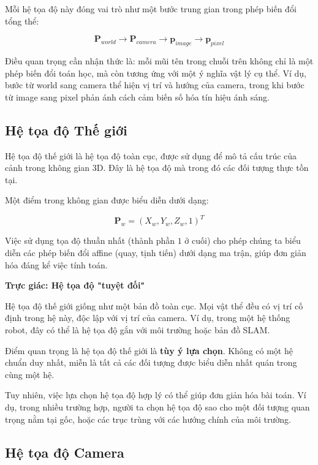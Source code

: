 Mỗi hệ tọa độ này đóng vai trò như một bước trung gian trong phép biến đổi tổng thể:

\[
\mathbf{P}_{world} \rightarrow \mathbf{P}_{camera} \rightarrow \mathbf{p}_{image} \rightarrow \mathbf{p}_{pixel}
\]

Điều quan trọng cần nhận thức là: mỗi mũi tên trong chuỗi trên không chỉ là một phép biến đổi toán học, mà còn tương ứng với một ý nghĩa vật lý cụ thể. Ví dụ, bước từ world sang camera thể hiện vị trí và hướng của camera, trong khi bước từ image sang pixel phản ánh cách cảm biến số hóa tín hiệu ánh sáng.

\subsection{Hệ tọa độ Thế giới}
\label{subsec:world_coordinate}

Hệ tọa độ thế giới là hệ tọa độ toàn cục, được sử dụng để mô tả cấu trúc của cảnh trong không gian 3D. Đây là hệ tọa độ mà trong đó các đối tượng thực tồn tại.

Một điểm trong không gian được biểu diễn dưới dạng:

\[
\mathbf{P}_w = (X_w, Y_w, Z_w, 1)^T
\]

Việc sử dụng tọa độ thuần nhất (thành phần $1$ ở cuối) cho phép chúng ta biểu diễn các phép biến đổi affine (quay, tịnh tiến) dưới dạng ma trận, giúp đơn giản hóa đáng kể việc tính toán.

\begin{mdframed}[style=infobox]
	\textbf{Trực giác: Hệ tọa độ "tuyệt đối"}
	
	Hệ tọa độ thế giới giống như một bản đồ toàn cục. Mọi vật thể đều có vị trí cố định trong hệ này, độc lập với vị trí của camera. Ví dụ, trong một hệ thống robot, đây có thể là hệ tọa độ gắn với môi trường hoặc bản đồ SLAM.
\end{mdframed}

Điểm quan trọng là hệ tọa độ thế giới là \textbf{tùy ý lựa chọn}. Không có một hệ chuẩn duy nhất, miễn là tất cả các đối tượng được biểu diễn nhất quán trong cùng một hệ.

Tuy nhiên, việc lựa chọn hệ tọa độ hợp lý có thể giúp đơn giản hóa bài toán. Ví dụ, trong nhiều trường hợp, người ta chọn hệ tọa độ sao cho một đối tượng quan trọng nằm tại gốc, hoặc các trục trùng với các hướng chính của môi trường.

\subsection{Hệ tọa độ Camera}
\label{subsec:camera_coordinate}

